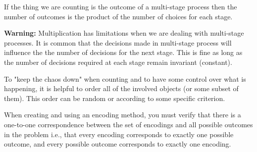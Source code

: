 \documentclass{article}
\begin{document}
\begin{tcolorbox}[title={PST: Menus Make You Multiply}, colback={white},colframe={black},sharp corners,colbacktitle={white},coltitle={black},fonttitle=\bfseries,subtitle style={boxrule=0.4pt,colback=white}]
		
If the thing we are counting is the outcome of a multi-stage process then the number of outcomes is the product of the number of choices for each stage.
		
\tcblower
		
\textbf{Warning:} Multiplication has limitations when we are dealing with multi-stage processes. It is common that the decisions made in multi-stage process will influence the the number of decisions for the next stage. This is fine as long as the number of decisions required at each stage remain invariant (constant).
\end{tcolorbox}

\begin{tcolorbox}[title={PPST: Keep the Chaos Down}, colback={white},colframe={black},sharp corners,colbacktitle={white},coltitle={black},fonttitle=\bfseries,subtitle style={boxrule=0.4pt,colback=white}]
To "keep the chaos down" when counting and to have some control over what is happening, it is helpful to order all of the involved objects (or some subset of them). This order can be random or according to some specific criterion.
\end{tcolorbox}


\begin{tcolorbox}[title={PST: Encoding}, colback={white},colframe={black},sharp corners,colbacktitle={white},coltitle={black},fonttitle=\bfseries,subtitle style={boxrule=0.4pt,colback=white}]

When creating and using an encoding method, you must verify that there is a one-to-one correspondence between the set of encodings and all possible outcomes in the problem i.e., that every encoding corresponds to exactly one possible outcome, and every possible outcome corresponds to exactly one encoding.
\end{tcolorbox}
	
\end{document}
